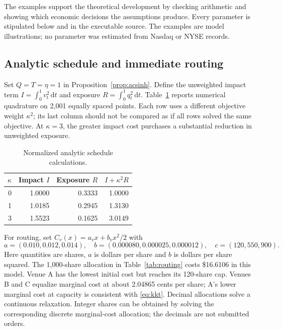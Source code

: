 \documentclass[11pt]{article}
\numberwithin{equation}{section}
\theoremstyle{definition}
\theoremstyle{remark}
\theoremstyle{definition}
\newcommand{\dd}{\,\mathrm d}
\begin{document}
The examples support the theoretical development by checking arithmetic and
showing which economic decisions the assumptions produce. Every parameter is
stipulated below and in the executable source. The examples are model
illustrations; no parameter was estimated from Nasdaq or NYSE records.

\subsection{Analytic schedule and immediate routing}

Set $Q=T=\eta=1$ in Proposition~\ref{prop:acsinh}. Define the unweighted impact
term $I=\int_0^1v_t^2\dd t$ and exposure $R=\int_0^1q_t^2\dd t$.
Table~\ref{tab:schedules} reports numerical quadrature on 2,001 equally spaced
points. Each row uses a different objective weight $\kappa^2$; its last
column should not be compared as if all rows solved the same objective.
At $\kappa=3$, the greater impact cost purchases a substantial reduction in
unweighted exposure.

\begin{table}[tb]
\centering
\caption{Normalized analytic schedule calculations.}
\label{tab:schedules}
\begin{tabular}{rrrr}
\toprule $\kappa$ & Impact $I$ & Exposure $R$ & $I+\kappa^2R$ \\\midrule
0 & 1.0000 & 0.3333 & 1.0000 \\
1 & 1.0185 & 0.2945 & 1.3130 \\
3 & 1.5523 & 0.1625 & 3.0149 \\

\bottomrule
\end{tabular}
\end{table}

For routing, set $C_v(x)=a_vx+b_vx^2/2$ with
\begin{equation}\label{eq:routeparams}
 a=(0.010,0.012,0.014),\quad
 b=(0.000080,0.000025,0.000012),\quad
 c=(120,550,900).
\end{equation}
Here quantities are shares, $a$ is dollars per share and $b$ is dollars per
share squared. The 1,000-share allocation in Table~\ref{tab:routing} costs
\$16.6106 in this model. Venue A has the lowest initial cost but reaches its
120-share cap. Venues B and C equalize marginal cost at about 2.04865 cents
per share; A's lower marginal cost at capacity is consistent with
\eqref{eq:kkt}. Decimal allocations solve a continuous relaxation. Integer
shares can be obtained by solving the corresponding discrete marginal-cost
allocation; the decimals are not submitted orders.
\end{document}
